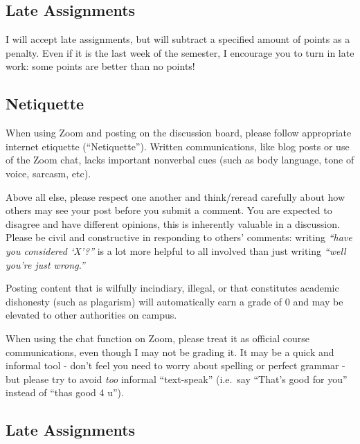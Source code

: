 \documentclass{article}
\begin{document}
\hypertarget{late-assignments}{%
\subsection*{Late Assignments}\label{late-assignments}}

I will accept late assignments, but will subtract a specified amount of
points as a penalty. Even if it is the last week of the semester, I
encourage you to turn in late work: some points are better than no
points!

\hypertarget{netiquette}{%
\subsection*{Netiquette}\label{netiquette}}

When using Zoom and posting on the discussion board, please follow
appropriate internet etiquette (``Netiquette''). Written communications,
like blog posts or use of the Zoom chat, lacks important nonverbal cues
(such as body language, tone of voice, sarcasm, etc).

Above all else, please respect one another and think/reread carefully
about how others may see your post before you submit a comment. You are
expected to disagree and have different opinions, this is inherently
valuable in a discussion. Please be civil and constructive in responding
to others' comments: writing \emph{``have you considered `X'?''} is a
lot more helpful to all involved than just writing \emph{``well you're
just wrong.''}

Posting content that is wilfully incindiary, illegal, or that
constitutes academic dishonesty (such as plagarism) will automatically
earn a grade of 0 and may be elevated to other authorities on campus.

When using the chat function on Zoom, please treat it as official course
communications, even though I may not be grading it. It may be a quick
and informal tool - don't feel you need to worry about spelling or
perfect grammar - but please try to avoid \emph{too} informal
``text-speak'' (i.e.~say ``That's good for you'' instead of ``thas good
4 u'').

\hypertarget{late-assignments-1}{%
\subsection*{Late Assignments}\label{late-assignments-1}}
\end{document}
